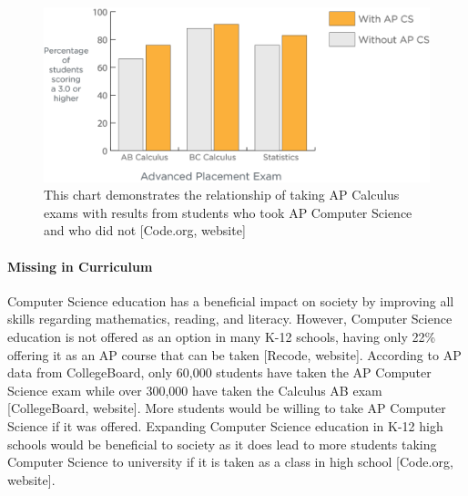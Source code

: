 \documentclass[12pt, letterpaper]{report}
\begin{document}
\begin{figure}[H]
    \centering
    \includegraphics[scale=0.85]{figure13.png}
    \captionsetup{justification=centering}
    \caption{This chart demonstrates the relationship of taking AP Calculus exams with results from students who took AP Computer Science and who did not [Code.org, website]}
\end{figure}

\paragraph*{Missing in Curriculum\\}

Computer Science education has a beneficial impact on society by improving all skills regarding mathematics, reading, and literacy. However, Computer Science education is not offered as an option in many K-12 schools, having only 22\% offering it as an AP course that can be taken [Recode, website]. According to AP data from CollegeBoard, only 60,000 students have taken the AP Computer Science exam while over 300,000 have taken the Calculus AB exam [CollegeBoard, website]. More students would be willing to take AP Computer Science if it was offered. Expanding Computer Science education in K-12 high schools would be beneficial to society as it does lead to more students taking Computer Science to university if it is taken as a class in high school [Code.org, website]. 
\end{document}
